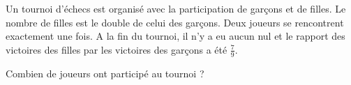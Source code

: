 \documentclass[varwidth]{standalone}
\begin{document}
    Un tournoi d'\'echecs est organis\'e avec la participation de gar\c cons et de filles. Le nombre de filles est le double de celui des gar\c cons. Deux joueurs se rencontrent exactement une fois. A la fin du tournoi, il n'y a eu aucun nul et le rapport des victoires des filles par les victoires des gar\c cons a \'et\'e $\frac{7}{9}$.

    Combien de joueurs ont particip\'e au tournoi ?
\end{document}
